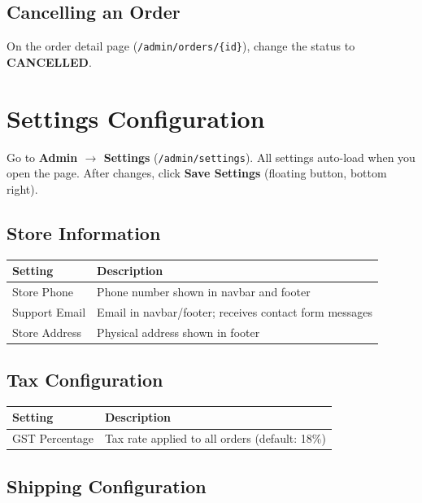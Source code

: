 \documentclass[12pt,a4paper]{article}
\begin{document}
\subsection{Cancelling an Order}

On the order detail page (\texttt{/admin/orders/\{id\}}), change the status to \textbf{CANCELLED}.

\section{Settings Configuration}
\label{sec:settings}

Go to \textbf{Admin $\rightarrow$ Settings} (\texttt{/admin/settings}). All settings auto-load when you open the page. After changes, click \textbf{Save Settings} (floating button, bottom right).

\subsection{Store Information}

\begin{tabular}{@{}L{5cm} L{8cm}@{}}
\toprule
\textbf{Setting} & \textbf{Description} \\
\midrule
Store Phone & Phone number shown in navbar and footer \\
Support Email & Email in navbar/footer; receives contact form messages \\
Store Address & Physical address shown in footer \\
\bottomrule
\end{tabular}

\subsection{Tax Configuration}

\begin{tabular}{@{}L{5cm} L{8cm}@{}}
\toprule
\textbf{Setting} & \textbf{Description} \\
\midrule
GST Percentage & Tax rate applied to all orders (default: 18\%) \\
\bottomrule
\end{tabular}

\subsection{Shipping Configuration}
\end{document}
